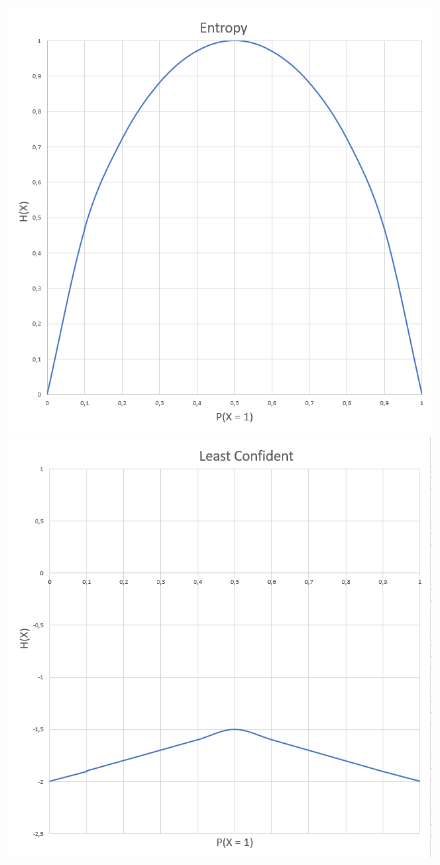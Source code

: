 \begin{figure}
    \centering
    \begin{minipage}{.33\textwidth}
      \centering
      \includegraphics[width=0.9\linewidth]{figures/entropy_graph.PNG}
    \end{minipage}%
    \begin{minipage}{.33\textwidth}
      \centering
      \includegraphics[width=0.9\linewidth]{figures/least_confident_graph.PNG}

\end{minipage}
\end{figure}
